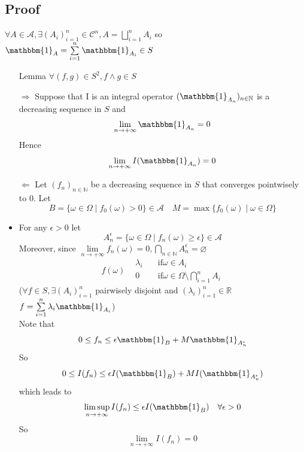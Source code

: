 \documentclass{book}
\begin{document}
\subsection{Proof}
$\forall A\in \mathcal{A},\exists(A_i)_{i=1}^n\in \mathcal{C}^n,A=\bigsqcup\limits_{i=1}^n A_i$ so $\mathbbm{1}_A=\sum\limits_{i=1}^n\mathbbm{1}_{A_i}\in S$
\begin{itemize}
    \item [Lemma]$\forall(f,g)\in S^2,f\wedge g\in S$
    \item [$\Rightarrow$]Suppose that I is an integral operator $(\mathbbm{1}_{A_n})_{n\in \mathbb{N}}$ is a decreasing sequence in $S$ and $$\lim\limits_{n\rightarrow+\infty}\mathbbm{1}_{A_n}=0$$ Hence $$\lim\limits_{n\rightarrow+\infty}I(\mathbbm{1}_{A_n})=0$$
    \item [$\Leftarrow$]Let $(f_n)_{n\in \mathbb{N}}$ be a decreasing sequence in $S$ that converges pointwisely to 0. Let $$B=\{\omega\in \Omega\mid f_0(\omega)>0\}\in \mathcal{A}\quad M=\max\{f_0(\omega)\mid \omega\in\Omega\}$$
    \item For any $\epsilon>0$ let $$A_n^\epsilon=\{\omega\in \Omega\mid f_n(\omega)\geq \epsilon\}\in \mathcal{A}$$
    Moreover, since $\lim\limits_{n\rightarrow+\infty}f_n(\omega)=0,\bigcap\limits_{n\in \mathbb{N}}A_n^\epsilon=\varnothing$
    $$f(\omega)\begin{aligned}
        &\lambda_i\quad &\text{if}\omega\in A_i\\
        &0\quad &\text{if}\omega\in \Omega\setminus \bigcap\limits_{i=1}^nA_i
    \end{aligned}$$
    ($\forall f\in S,\exists(A_i)_{i=1}^n$ pairwisely disjoint and $(\lambda_i)_{i=1}^n\in \mathbb{R}$ $f=\sum\limits_{i=1}^n\lambda_i\mathbbm{1}_{A_i}$)\\
    Note that $$0\leq f_n\leq \epsilon\mathbbm{1}_B+M\mathbbm{1}_{A_n^\epsilon}$$
    So $$0\leq I(f_n)\leq\epsilon I(\mathbbm{1}_B)+M I(\mathbbm{1}_{A_n^\epsilon})$$
    which leads to $$\limsup\limits_{n\rightarrow+\infty}I(f_n)\leq\epsilon I(\mathbbm{1}_B)\quad \forall \epsilon>0$$
    So $$\lim\limits_{n\rightarrow+\infty}I(f_n)=0$$
\end{itemize}
\end{document}
